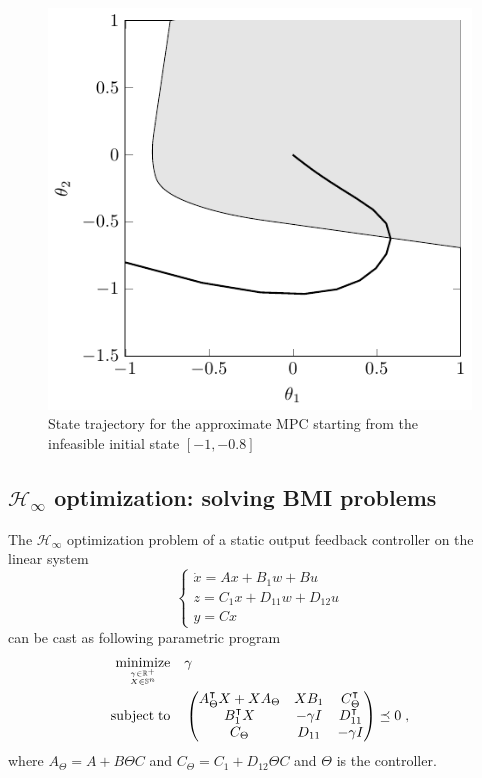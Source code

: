 \documentclass{article}
\DeclareMathOperator*{\minimize}{minimize}
\DeclareMathOperator*{\subj}{subject\;to}
\newcommand{\R}{\mathbb{R}}         %
\renewcommand{\S}{\mathbb{S}}       %
\renewcommand{\t}{\intercal}        %
\newcommand{\pPar}{\Theta}                          %
\begin{document}
\begin{figure}
\centering
\includegraphics{figures/mpc_bemporad2002_if_tikz.pdf}
\caption{State trajectory for the approximate MPC starting from the infeasible
initial state $[-1, -0.8]$}\label{fig:MPC_Bemporad2002}
\end{figure}


\subsection{$\mathcal{H}_\infty$ optimization: solving BMI problems}
The $\mathcal{H}_\infty$ optimization problem of a static output feedback
controller on the linear system
\[
\begin{cases}
\dot{x} = Ax + B_1 w + Bu \\
z = C_1 x + D_{11} w + D_{12} u \\
y = Cx
\end{cases}
\]
can be cast as following parametric program
\[
\begin{aligned}
\minimize_{\gamma \in \R^+ \atop X \in \S^n} &&& \gamma  \\
\subj              &&&
\begin{pmatrix}
A_\pPar^\t X + X A_\pPar  &  XB_1  &  C_\pPar^\t \\
B_1^\t X                  & -\gamma I & D_{11}^\t \\
C_\pPar                   & D_{11}    & -\gamma I
\end{pmatrix} \preceq 0 \; ,
\end{aligned}
\]
where $A_\pPar = A + B \pPar C$ and $C_\pPar = C_1 + D_{12} \pPar C$ and $\pPar$
is the controller.
\end{document}
